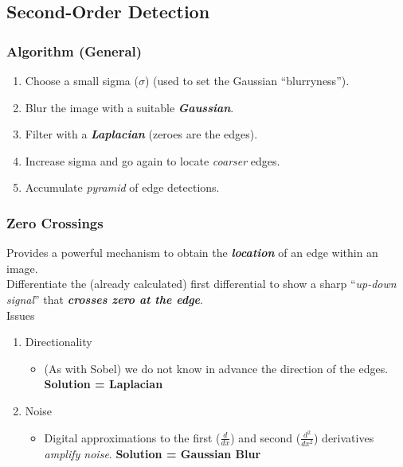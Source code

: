 \documentclass[english, 10pt]{article}
\begin{document}
\subsection{Second-Order Detection}

\subsubsection{Algorithm (General)}

  \begin{enumerate}
  \def\labelenumi{\arabic{enumi}.}
  \itemsep1pt\parskip0pt
  \item
    Choose a small sigma ($\sigma$) (used to set the
    Gaussian ``blurryness'').
  \item
    Blur the image with a suitable \textbf{\emph{Gaussian}}.
  \item
    Filter with a \textbf{\emph{Laplacian}} (zeroes are the edges).
  \item
    Increase sigma and go again to locate \emph{coarser} edges.
  \item
    Accumulate \emph{pyramid} of edge detections.
  \end{enumerate}


\subsubsection{Zero Crossings}

  Provides a powerful mechanism to obtain the \textbf{\emph{location}}
  of an edge within an image.\\
  
  Differentiate the (already calculated) first differential to show a
  sharp ``\emph{up-down signal}'' that \textbf{\emph{crosses zero at the
  edge}}.\\
  
  Issues

  \begin{enumerate}
  \def\labelenumi{\arabic{enumi}.}
  \itemsep1pt\parskip0pt
  \item
    Directionality

    \begin{itemize}
    \itemsep1pt\parskip0pt
    \item
      (As with Sobel) we do not know in advance the direction of the
      edges. \textbf{Solution = Laplacian}
    \end{itemize}
  \item
    Noise

    \begin{itemize}
    \itemsep1pt\parskip0pt
    \item
      Digital approximations to the first ($\frac{d}{dx}$) and second
      ($\frac{d^2}{dx^2}$) derivatives \emph{amplify noise}. \textbf{Solution = Gaussian Blur}
    \end{itemize}
  \end{enumerate}
\end{document}
